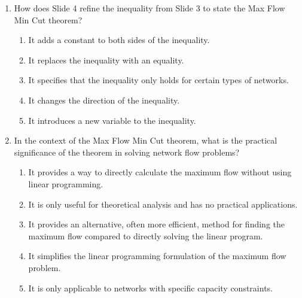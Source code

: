\documentclass{article}%
\begin{document}
\begin{enumerate}
\begin{enumerate}
\item It shows that the minimum cut capacity is always less than or equal to the maximum flow.%
\item It is irrelevant to the Max Flow Min Cut theorem.%
\item It only applies to specific types of network flows.%
\end{enumerate}%
\vspace{1em}%
\item How does Slide 4 refine the inequality from Slide 3 to state the Max Flow Min Cut theorem?%
\begin{enumerate}%
\item It adds a constant to both sides of the inequality.%
\item It replaces the inequality with an equality.%
\item It specifies that the inequality only holds for certain types of networks.%
\item It changes the direction of the inequality.%
\item It introduces a new variable to the inequality.%
\end{enumerate}%
\vspace{1em}%
\item In the context of the Max Flow Min Cut theorem, what is the practical significance of the theorem in solving network flow problems?%
\begin{enumerate}%
\item It provides a way to directly calculate the maximum flow without using linear programming.%
\item It is only useful for theoretical analysis and has no practical applications.%
\item It provides an alternative, often more efficient, method for finding the maximum flow compared to directly solving the linear program.%
\item It simplifies the linear programming formulation of the maximum flow problem.%
\item It is only applicable to networks with specific capacity constraints.%
\end{enumerate}%
\vspace{1em}%
\end{enumerate}

%
\newpage%
\end{document}
